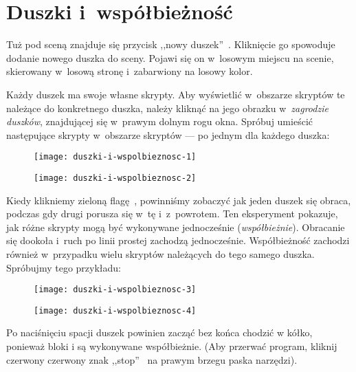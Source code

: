 \documentclass[a4paper]{report}
\begin{document}

\section{Duszki i~współbieżność}

Tuż pod sceną znajduje się przycisk ,,nowy duszek''~. Kliknięcie go spowoduje dodanie nowego duszka do sceny. Pojawi się on w~losowym miejscu na scenie, skierowany w~losową stronę i~zabarwiony na losowy kolor.

Każdy duszek ma swoje własne skrypty. Aby wyświetlić w~obszarze skryptów te należące do konkretnego duszka, należy kliknąć na jego obrazku w~\emph{zagrodzie duszków}, znajdującej się w~prawym dolnym rogu okna. Spróbuj umieścić następujące skrypty w~obszarze skryptów --- po jednym dla każdego duszka:\nopagebreak

\begin{figure}[H]
\begin{minipage}{0.5\textwidth}
\centering
\texttt{[image: duszki-i-wspolbieznosc-1]}
\end{minipage}%
\begin{minipage}{0.5\textwidth}
\centering
\texttt{[image: duszki-i-wspolbieznosc-2]}
\end{minipage}
\end{figure}

Kiedy klikniemy zieloną flagę~, powinniśmy zobaczyć jak jeden duszek się obraca, podczas gdy drugi porusza się w~tę i~z~powrotem. Ten eksperyment pokazuje, jak różne skrypty mogą być wykonywane jednocześnie (\emph{współbieżnie}). Obracanie się dookoła i~ruch po linii prostej zachodzą jednocześnie. Współbieżność zachodzi również w~przypadku wielu skryptów należących do tego samego duszka. Spróbujmy tego przykładu:\nopagebreak

\begin{figure}[H]
\begin{minipage}{0.5\textwidth}
\centering
\texttt{[image: duszki-i-wspolbieznosc-3]}
\end{minipage}%
\begin{minipage}{0.5\textwidth}
\centering
\texttt{[image: duszki-i-wspolbieznosc-4]}
\end{minipage}
\end{figure}

Po naciśnięciu spacji duszek powinien zacząć bez końca chodzić w kółko, ponieważ bloki  i  są wykonywane współbieżnie. (Aby przerwać program, kliknij czerwony czerwony znak ,,stop''~ na prawym brzegu paska narzędzi).
\end{document}
